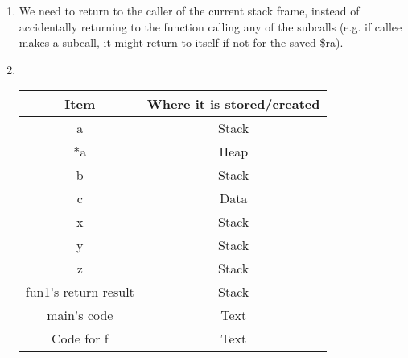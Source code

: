 \documentclass[12pt, a4paper]{article}
\begin{document}
\begin{enumerate}[Q\arabic*.]
  \item We need to return to the caller of the current stack frame, instead of accidentally returning to the function calling any of the subcalls (e.g. if callee makes a subcall, it might return to itself if not for the saved \$ra).

  \pagebreak

  \item \quad\\ 
    \begin{tabular}{|c|c|}
      \hline
      \textbf{Item} & \textbf{Where it is stored/created} \\
      \hline
      a & Stack\\
      \hline
      *a & Heap\\
      \hline
      b &  Stack\\
      \hline
      c &  Data\\
      \hline
      x &  Stack\\
      \hline
      y &  Stack\\
      \hline
      z &  Stack\\
      \hline
      fun1's return result & Stack\\
      \hline
      main's code & Text\\
      \hline
      Code for f & Text\\
      \hline
    \end{tabular}
\end{enumerate}
\end{document}
